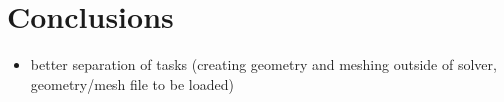 \chapter{Conclusions} %
\label{cha:conclusion}

\begin{itemize}
\item better separation of tasks (creating geometry and meshing outside of solver, geometry/mesh file to be loaded)
\end{itemize}

